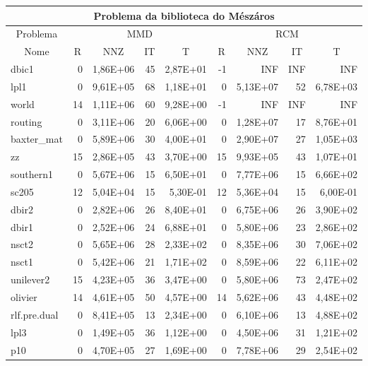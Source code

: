 \begin{tabular}{|l|r|r|r|r|r|r|r|r|}
\hline
\multicolumn{9}{|c|}{Problema da biblioteca do Mészáros} \\ \hline
\multicolumn{1}{|c|}{Problema} & \multicolumn{4}{|c|}{MMD} &         \multicolumn{4}{|c|}{RCM} \\ \hline
\multicolumn{1}{|c|}{Nome} & \multicolumn{1}{|c|}{R} &
        \multicolumn{1}{|c|}{NNZ} & \multicolumn{1}{|c|}{IT} &
        \multicolumn{1}{|c|}{T} & \multicolumn{1}{|c|}{R} &
        \multicolumn{1}{|c|}{NNZ} & \multicolumn{1}{|c|}{IT} &
        \multicolumn{1}{|c|}{T} \\ \hline
dbic1 & 0 & 1,86E+06 & 45 & 2,87E+01 & -1 & INF & INF & INF \\ \hline
lpl1 & 0 & 9,61E+05 & 68 & 1,18E+01 & 0 & 5,13E+07 & 52 & 6,78E+03 \\ \hline
world & 14 & 1,11E+06 & 60 & 9,28E+00 & -1 & INF & INF & INF \\ \hline
routing & 0 & 3,11E+06 & 20 & 6,06E+00 & 0 & 1,28E+07 & 17 & 8,76E+01 \\ \hline
baxter\_mat & 0 & 5,89E+06 & 30 & 4,00E+01 & 0 & 2,90E+07 & 27 & 1,05E+03 \\ \hline
zz & 15 & 2,86E+05 & 43 & 3,70E+00 & 15 & 9,93E+05 & 43 & 1,07E+01 \\ \hline
southern1 & 0 & 5,67E+06 & 15 & 6,50E+01 & 0 & 7,77E+06 & 15 & 6,66E+02 \\ \hline
sc205 & 12 & 5,04E+04 & 15 & 5,30E-01 & 12 & 5,36E+04 & 15 & 6,00E-01 \\ \hline
dbir2 & 0 & 2,82E+06 & 26 & 8,40E+01 & 0 & 6,75E+06 & 26 & 3,90E+02 \\ \hline
dbir1 & 0 & 2,52E+06 & 24 & 6,88E+01 & 0 & 5,80E+06 & 23 & 2,86E+02 \\ \hline
nsct2 & 0 & 5,65E+06 & 28 & 2,33E+02 & 0 & 8,35E+06 & 30 & 7,06E+02 \\ \hline
nsct1 & 0 & 5,42E+06 & 21 & 1,71E+02 & 0 & 8,59E+06 & 22 & 6,11E+02 \\ \hline
unilever2 & 15 & 4,23E+05 & 36 & 3,47E+00 & 0 & 5,80E+06 & 73 & 2,47E+02 \\ \hline
olivier & 14 & 4,61E+05 & 50 & 4,57E+00 & 14 & 5,62E+06 & 43 & 4,48E+02 \\ \hline
rlf.pre.dual & 0 & 8,41E+05 & 13 & 2,34E+00 & 0 & 6,10E+06 & 13 & 4,88E+02 \\ \hline
lpl3 & 0 & 1,49E+05 & 36 & 1,12E+00 & 0 & 4,50E+06 & 31 & 1,21E+02 \\ \hline
p10 & 0 & 4,70E+05 & 27 & 1,69E+00 & 0 & 7,78E+06 & 29 & 2,54E+02 \\ \hline

\end{tabular}
